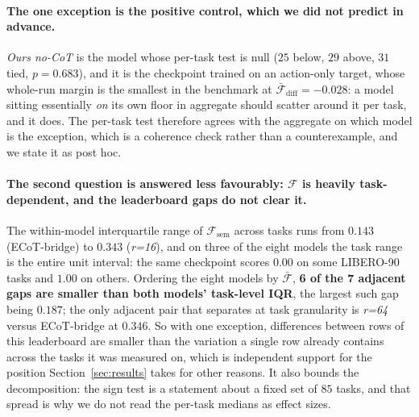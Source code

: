 \documentclass{article}
\begin{document}
\paragraph{The one exception is the positive control, which we did not predict in advance.} \emph{Ours no-CoT} is the model whose per-task test is null ($25$ below, $29$ above, $31$ tied, $p = 0.683$), and it is the checkpoint trained on an action-only target, whose whole-run margin is the smallest in the benchmark at $\bar{\mathcal{F}}_{\text{diff}} = -0.028$: a model sitting essentially \emph{on} its own floor in aggregate should scatter around it per task, and it does. The per-task test therefore agrees with the aggregate on which model is the exception, which is a coherence check rather than a counterexample, and we state it as post hoc.

\paragraph{The second question is answered less favourably: $\mathcal{F}$ is heavily task-dependent, and the leaderboard gaps do not clear it.} The within-model interquartile range of $\mathcal{F}_{\text{sem}}$ across tasks runs from $0.143$ (ECoT-bridge) to $0.343$ (\emph{r=16}), and on three of the eight models the task range is the entire unit interval: the same checkpoint scores $0.00$ on some LIBERO-90 tasks and $1.00$ on others. Ordering the eight models by $\bar{\mathcal{F}}$, \textbf{6 of the 7 adjacent gaps are smaller than both models' task-level IQR}, the largest such gap being $0.187$; the only adjacent pair that separates at task granularity is \emph{r=64} versus ECoT-bridge at $0.346$. So with one exception, differences between rows of this leaderboard are smaller than the variation a single row already contains across the tasks it was measured on, which is independent support for the position Section~\ref{sec:results} takes for other reasons. It also bounds the decomposition: the sign test is a statement about a fixed set of $85$ tasks, and that spread is why we do not read the per-task medians as effect sizes.
\end{document}
